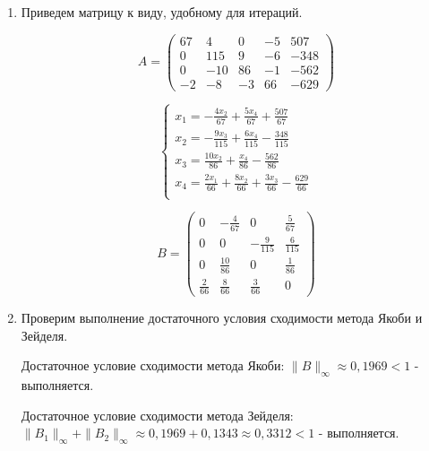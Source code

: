\documentclass[a4paper,12pt]{article} %
\begin{document}
\begin{enumerate}

\item Приведем матрицу к виду, удобному для итераций.

\begin{equation*}
    A =
    \begin{pmatrix}
        67 & 4 & 0 & -5 & 507 \\
        0 & 115 & 9 & -6 & -348 \\
        0 & -10 & 86 & -1 & -562 \\
        -2 & -8 & -3 & 66 & -629
    \end{pmatrix}
\end{equation*}

\begin{equation*}
\begin{cases}
    x_1 = -\frac{4x_2}{67} + \frac{5x_4}{67} + \frac{507}{67} \\
    x_2 = -\frac{9x_3}{115} + \frac{6x_4}{115} - \frac{348}{115} \\
    x_3 = \frac{10x_2}{86} + \frac{x_4}{86} - \frac{562}{86} \\
    x_4 = \frac{2x_1}{66} + \frac{8x_2}{66} + \frac{3x_3}{66} - \frac{629}{66} \\
\end{cases}
\end{equation*}

\begin{equation*}
    B =
    \begin{pmatrix}
        0 & -\frac{4}{67} & 0 & \frac{5}{67}  \\
        0 & 0 & -\frac{9}{115} & \frac{6}{115}  \\
        0 & \frac{10}{86} & 0 & \frac{1}{86}  \\
        \frac{2}{66} & \frac{8}{66} & \frac{3}{66} & 0 
    \end{pmatrix}
\end{equation*}

\newpage

\item Проверим выполнение достаточного условия сходимости метода Якоби и Зейделя.

Достаточное условие сходимости метода Якоби: $\|B\|_\infty \approx 0,1969 < 1$ - выполняется.

Достаточное условие сходимости метода Зейделя: $\|B_1\|_\infty + \|B_2\|_\infty \approx 0,1969 + 0,1343 \approx 0,3312 < 1$ - выполняется.


\end{enumerate}
\end{document}
